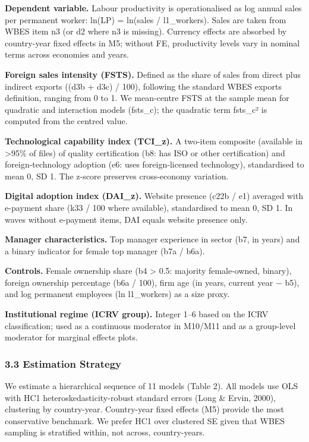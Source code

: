 \documentclass[
  12pt,a4paper]{article}
\begin{document}
\textbf{Dependent variable.} Labour productivity is operationalised as
log annual sales per permanent worker: ln(LP) = ln(sales / l1\_workers).
Sales are taken from WBES item n3 (or d2 where n3 is missing). Currency
effects are absorbed by country-year fixed effects in M5; without FE,
productivity levels vary in nominal terms across economies and years.

\textbf{Foreign sales intensity (FSTS).} Defined as the share of sales
from direct plus indirect exports ((d3b + d3c) / 100), following the
standard WBES exports definition, ranging from 0 to 1. We mean-centre
FSTS at the sample mean for quadratic and interaction models (fsts\_c);
the quadratic term fsts\_c² is computed from the centred value.

\textbf{Technological capability index (TCI\_z).} A two-item composite
(available in \textgreater95\% of files) of quality certification (b8:
has ISO or other certification) and foreign-technology adoption (e6:
uses foreign-licensed technology), standardised to mean 0, SD 1. The
z-score preserves cross-economy variation.

\textbf{Digital adoption index (DAI\_z).} Website presence (c22b / e1)
averaged with e-payment share (k33 / 100 where available), standardised
to mean 0, SD 1. In waves without e-payment items, DAI equals website
presence only.

\textbf{Manager characteristics.} Top manager experience in sector (b7,
in years) and a binary indicator for female top manager (b7a / b6a).

\textbf{Controls.} Female ownership share (b4 \textgreater{} 0.5:
majority female-owned, binary), foreign ownership percentage (b6a /
100), firm age (in years, current year − b5), and log permanent
employees (ln l1\_workers) as a size proxy.

\textbf{Institutional regime (ICRV group).} Integer 1--6 based on the
ICRV classification; used as a continuous moderator in M10/M11 and as a
group-level moderator for marginal effects plots.

\hypertarget{estimation-strategy}{%
\subsubsection{3.3 Estimation Strategy}\label{estimation-strategy}}

We estimate a hierarchical sequence of 11 models (Table 2). All models
use OLS with HC1 heteroskedasticity-robust standard errors (Long \&
Ervin, 2000), clustering by country-year. Country-year fixed effects
(M5) provide the most conservative benchmark. We prefer HC1 over
clustered SE given that WBES sampling is stratified within, not across,
country-years.
\end{document}
